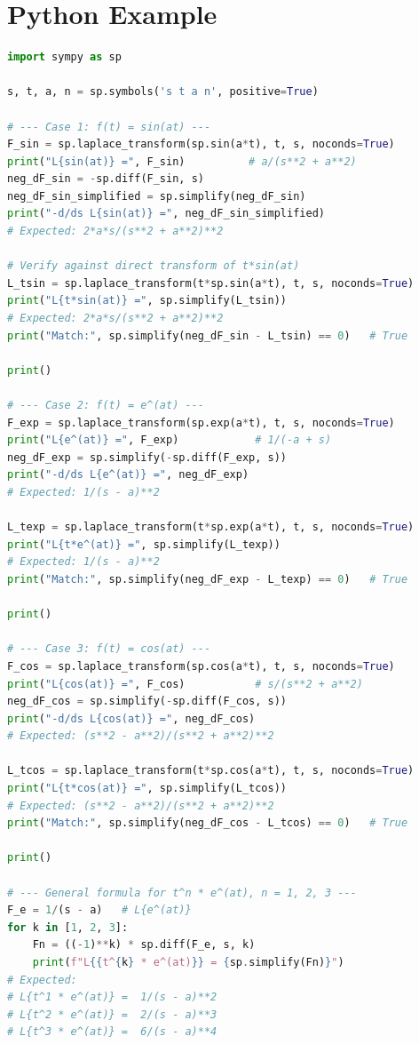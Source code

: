 \documentclass[12pt,a4paper]{article}
\begin{document}
\section{Python Example}
\begin{lstlisting}[language=Python, caption={Symbolic verification of multiplication-by-$t$ property using SymPy}]
import sympy as sp

s, t, a, n = sp.symbols('s t a n', positive=True)

# --- Case 1: f(t) = sin(at) ---
F_sin = sp.laplace_transform(sp.sin(a*t), t, s, noconds=True)
print("L{sin(at)} =", F_sin)          # a/(s**2 + a**2)
neg_dF_sin = -sp.diff(F_sin, s)
neg_dF_sin_simplified = sp.simplify(neg_dF_sin)
print("-d/ds L{sin(at)} =", neg_dF_sin_simplified)
# Expected: 2*a*s/(s**2 + a**2)**2

# Verify against direct transform of t*sin(at)
L_tsin = sp.laplace_transform(t*sp.sin(a*t), t, s, noconds=True)
print("L{t*sin(at)} =", sp.simplify(L_tsin))
# Expected: 2*a*s/(s**2 + a**2)**2
print("Match:", sp.simplify(neg_dF_sin - L_tsin) == 0)   # True

print()

# --- Case 2: f(t) = e^(at) ---
F_exp = sp.laplace_transform(sp.exp(a*t), t, s, noconds=True)
print("L{e^(at)} =", F_exp)            # 1/(-a + s)
neg_dF_exp = sp.simplify(-sp.diff(F_exp, s))
print("-d/ds L{e^(at)} =", neg_dF_exp)
# Expected: 1/(s - a)**2

L_texp = sp.laplace_transform(t*sp.exp(a*t), t, s, noconds=True)
print("L{t*e^(at)} =", sp.simplify(L_texp))
# Expected: 1/(s - a)**2
print("Match:", sp.simplify(neg_dF_exp - L_texp) == 0)   # True

print()

# --- Case 3: f(t) = cos(at) ---
F_cos = sp.laplace_transform(sp.cos(a*t), t, s, noconds=True)
print("L{cos(at)} =", F_cos)           # s/(s**2 + a**2)
neg_dF_cos = sp.simplify(-sp.diff(F_cos, s))
print("-d/ds L{cos(at)} =", neg_dF_cos)
# Expected: (s**2 - a**2)/(s**2 + a**2)**2

L_tcos = sp.laplace_transform(t*sp.cos(a*t), t, s, noconds=True)
print("L{t*cos(at)} =", sp.simplify(L_tcos))
# Expected: (s**2 - a**2)/(s**2 + a**2)**2
print("Match:", sp.simplify(neg_dF_cos - L_tcos) == 0)   # True

print()

# --- General formula for t^n * e^(at), n = 1, 2, 3 ---
F_e = 1/(s - a)   # L{e^(at)}
for k in [1, 2, 3]:
    Fn = ((-1)**k) * sp.diff(F_e, s, k)
    print(f"L{{t^{k} * e^(at)}} = {sp.simplify(Fn)}")
# Expected:
# L{t^1 * e^(at)} =  1/(s - a)**2
# L{t^2 * e^(at)} =  2/(s - a)**3
# L{t^3 * e^(at)} =  6/(s - a)**4
\end{lstlisting}
\end{document}
